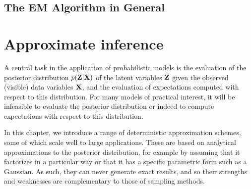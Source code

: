 \documentclass[a4paper]{article}
\begin{document}
\subsection{The EM Algorithm in General}

\section{Approximate inference} 
A central task in the application of probabilistic models is 
the evaluation of the posterior distribution $p(\boldsymbol{\mathbf{Z}}|\boldsymbol{\mathbf{X}})$ of the 
latent variables $\boldsymbol{\mathbf{Z}}$ given the observed (visible) data variables 
$\boldsymbol{\mathbf{X}}$, and the evaluation of expectations computed with respect 
to this distribution. For many models of practical interest, 
it will be infeasible 
to evaluate the posterior distribution or indeed to compute 
expectations with respect to this distribution.

In this chapter, we introduce a range of deterministic 
approximation schemes, some of which scale well to large 
applications. These are based on analytical approximations 
to the posterior distribution, for example by assuming that 
it factorizes in a particular way or that it has a specific 
parametric form such as a Gaussian. As such, they can never 
generate exact results, and so their strengths and weaknesses 
are complementary to those of sampling methods.
\end{document}

